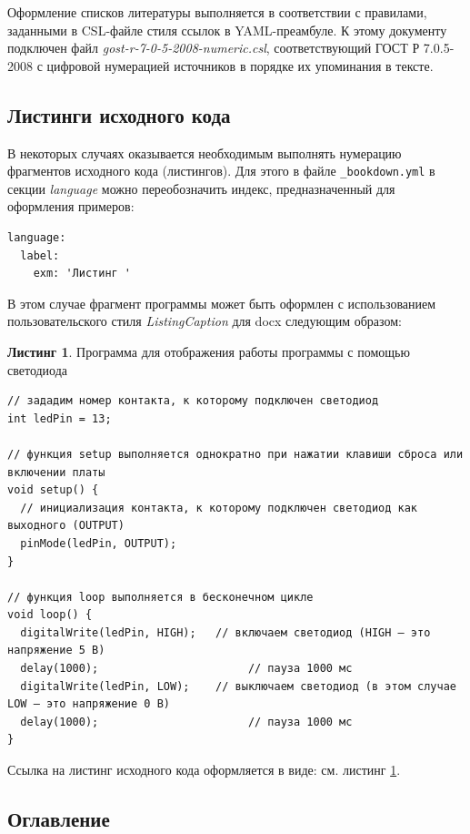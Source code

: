 \documentclass[
  a4paper,
]{book}
\theoremstyle{definition}
\theoremstyle{definition}
\newtheorem{example}{Листинг}[chapter]
\theoremstyle{definition}
\theoremstyle{definition}
\theoremstyle{remark}
\begin{document}
Оформление списков литературы выполняется в соответствии с правилами, заданными в CSL-файле стиля ссылок в YAML-преамбуле. К этому документу подключен файл \emph{gost-r-7-0-5-2008-numeric.csl}, соответствующий ГОСТ Р 7.0.5-2008 с цифровой нумерацией источников в порядке их упоминания в тексте.

\subsection{Листинги исходного кода}\label{markdown-listings}

В некоторых случаях оказывается необходимым выполнять нумерацию фрагментов исходного кода (листингов). Для этого в файле \texttt{\_bookdown.yml} в секции \emph{language} можно переобозначить индекс, предназначенный для оформления примеров:

\begin{verbatim}
language:
  label:
    exm: 'Листинг '
\end{verbatim}

В этом случае фрагмент программы может быть оформлен с использованием пользовательского стиля \emph{ListingCaption} для docx следующим образом:

\begin{example}
\protect\hypertarget{exm:code-blink}{}\label{exm:code-blink}Программа для отображения работы программы с помощью светодиода
\end{example}

\begin{verbatim}
// зададим номер контакта, к которому подключен светодиод
int ledPin = 13;

// функция setup выполняется однократно при нажатии клавиши сброса или включении платы
void setup() {
  // инициализация контакта, к которому подключен светодиод как выходного (OUTPUT)
  pinMode(ledPin, OUTPUT);
}

// функция loop выполняется в бесконечном цикле
void loop() {
  digitalWrite(ledPin, HIGH);   // включаем светодиод (HIGH – это напряжение 5 В)
  delay(1000);                       // пауза 1000 мс
  digitalWrite(ledPin, LOW);    // выключаем светодиод (в этом случае LOW – это напряжение 0 В)
  delay(1000);                       // пауза 1000 мс
}
\end{verbatim}

Ссылка на листинг исходного кода оформляется в виде: см. листинг \ref{exm:code-blink}.

\subsection{Оглавление}\label{markdown-toc}
\end{document}
